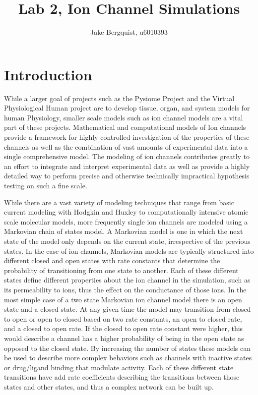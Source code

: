 \documentclass[12pt]{article}
\begin{document}
\title{Lab 2, Ion Channel Simulations}
\author{Jake Bergquist, u6010393}
\maketitle
\tableofcontents
\newpage

\section{Introduction}
\par{}
While a larger goal of projects such as the Pysiome Project and the Virtual Physiological Human project are to develop tissue, organ, and system models for human Physiology, smaller scale models such as ion channel models are a vital part of these projects.\cite{Fink2011} Mathematical and computational models of Ion channels provide a framework for highly controlled investigation of the properties of these channels as well as the combination of vast amounts of experimental data into a single comprehensive model.  The modeling of ion channels contributes greatly to an effort to integrate and interpret experimental data as well as provide a highly detailed way to perform precise and otherwise technically impractical hypothesis testing on such a fine scale.
\par{}
While there are a vast variety of modeling techniques that range from basic current modeling with Hodgkin and Huxley to computationally intensive atomic scale molecular models, more frequently single ion channels are modeled using a Markovian chain of states model.\cite{Fink2011}\cite{Kojima2018a}
A Markovian model is one in which the next state of the model only depends on the current state, irrespective of the previous states. In the case of ion channels, Markovian models are typically structured into different closed and open states with rate constants that determine the probability of transitioning from one state to another. Each of these different states define different properties about the ion channel in the simulation, such as its permeability to ions, thus the effect on the conductance of those ions.\cite{Fink2011} In the most simple case of a two state Markovian ion channel model there is an open state and a closed state. At any given time the model may transition from closed to open or open to closed based on two rate constants, an open to closed rate, and a closed to open rate. If the closed to open rate constant were higher, this would describe a channel has a higher probability of being in the open state as opposed to the closed state. By increasing the number of states these models can be used to describe more complex behaviors such as channels with inactive states or drug/ligand binding that modulate activity. Each of these different state transitions have add rate coefficients describing the transitions between those states and other states, and thus a complex network can be built up.
\end{document}
